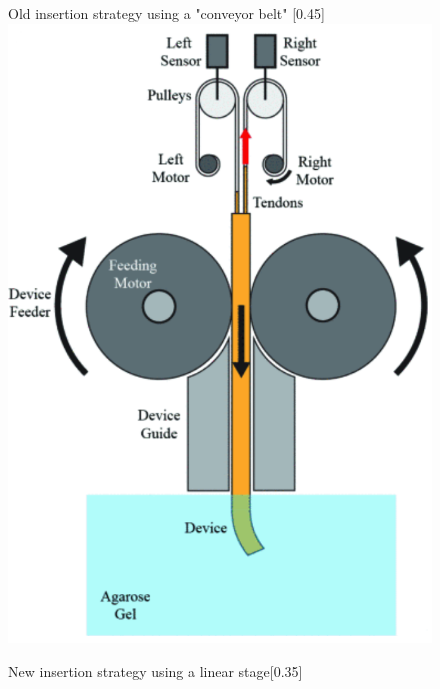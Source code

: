 \begin{figure}[H]
    \centering
    \begin{subcaptionbox}{Old insertion strategy using a "conveyor belt" \label{fig:conveyor}}[0.45\linewidth]
        {\includegraphics[width=\linewidth]{images/Hardware/oldInsertion.PNG}}
    \end{subcaptionbox}
    \hspace{0.05\linewidth}
    \begin{subcaptionbox}{New insertion strategy using a linear stage\label{fig:right}}[0.35\linewidth]

\end{subcaptionbox}
\end{figure}
